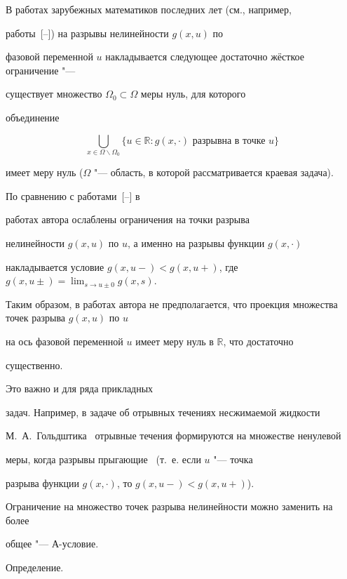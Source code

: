 В работах зарубежных математиков последних лет (см., например,

работы~[--]) на разрывы нелинейности $g(x, u)$ по

фазовой переменной $u$ накладывается следующее достаточно жёсткое ограничение "---

существует множество $\Omega_0\subset\Omega$ меры нуль, для которого 

объединение

$$

\bigcup\limits_{x\in\Omega\backslash\Omega_0}\{u\in\mathbb R: g(x,\cdot)

\mbox{ разрывна в точке } u\}

$$

имеет меру нуль ($\Omega$ "---  область, в которой рассматривается краевая задача).                                                      

По сравнению с работами~[--] в 

работах автора ослаблены ограничения на точки разрыва

нелинейности $g(x,u)$ по $u$, а именно на разрывы функции $g(x,\cdot)$

накладывается условие $g(x,u-)<g(x,u+)$, где $g(x,u\pm)=\lim_{s\to u\pm 0}g(x,s)$.

Таким образом, в работах автора не предполагается, что проекция множества точек разрыва $g(x,u)$ по $u$

на ось фазовой переменной $u$ имеет меру нуль в $\mathbb R$, что достаточно

существенно.

Это важно и для ряда прикладных

задач. Например, в задаче об отрывных течениях несжимаемой жидкости

М.~А.~Гольдштика~\cite{gold} отрывные течения формируются на множестве ненулевой

меры, когда разрывы  прыгающие~\cite{pot5, pot12} (т.~е. если $u$ "---  точка

разрыва функции $g(x,\cdot)$, то $g(x,u-)<g(x,u+)$).

Ограничение на множество точек разрыва нелинейности можно заменить на более

общее "---  А-условие.



\smallskip



{\sc Определение.}

